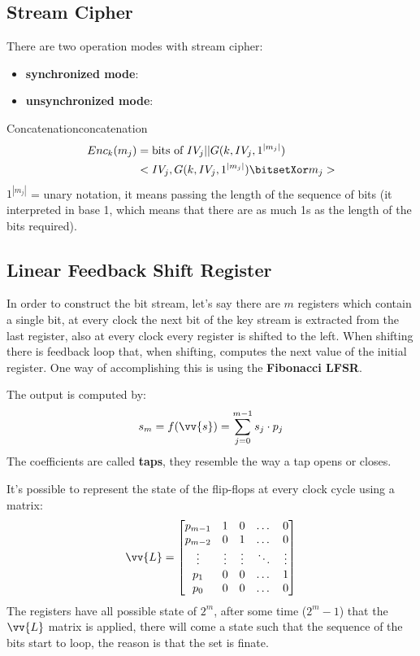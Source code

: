 \documentclass[12pt]{article}
\begin{document}
\subsection{Stream Cipher}
There are two operation modes with stream cipher:
\begin{itemize}
  \item \textbf{synchronized mode}:
  \item \textbf{unsynchronized mode}:
\end{itemize}

\begin{definition}{Concatenation}{concatenation}
  \begin{align*}
    Enc_k(m_j) &= \text{bits of }IV_j || G(k, IV_j, 1^{|m_j|}) \\
    & <IV_j, G(k, IV_j, 1^{|m_j|}) \bitsetXor m_j>
  \end{align*}
  $1^{|m_j|}$ = unary notation, it means passing the length of the sequence of bits (it interpreted in base 1, which means that there are as much 1s as the length of the bits required).
\end{definition}


\subsection{Linear Feedback Shift Register}
In order to construct the bit stream, let's say there are $m$ registers which contain a single bit, at every clock the next bit of the key stream is extracted from the last register, also at every clock every register is shifted to the left. When shifting there is feedback loop that, when shifting, computes the next value of the initial register. One way of accomplishing this is using the \textbf{Fibonacci LFSR}.

The output is computed by:
\[ s_m = f(\vv{s}) = \sum_{j=0}^{m-1} s_j \cdot p_j \]
The coefficients are called \textbf{taps}, they resemble the way a tap opens or closes.

It's possible to represent the state of the flip-flops at every clock cycle using a matrix:
\[ \vv{L} = \left[ \begin{matrix}
  p_{m-1} & 1 & 0 & \dots & 0 \\
  p_{m-2} & 0 & 1 & \dots & 0 \\
  \vdots & \vdots & \vdots & \ddots & \vdots \\
  p_1 & 0 & 0 & \dots & 1 \\
  p_0 & 0 & 0 & \dots & 0
\end{matrix} \right]
\]
The registers have all possible state of $2^{m}$, after some time ($2^{m}-1$) that the $\vv{L}$ matrix is applied, there will come a state such that the sequence of the bits start to loop, the reason is that the set is finate.
\end{document}
